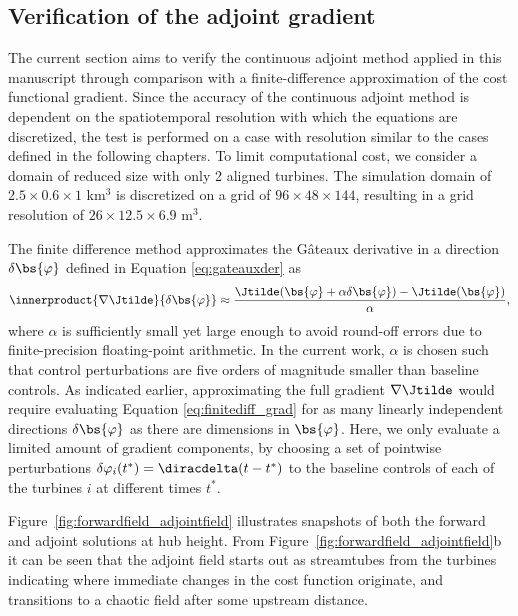 	\subsection{Verification of the adjoint gradient}\label{sec:problem_verification}
	The current section aims to verify the continuous adjoint method applied in this manuscript through comparison with a finite-difference approximation of the cost functional gradient. Since the accuracy of the continuous adjoint method is dependent on the spatiotemporal resolution with which the equations are discretized, the test is performed on a case with resolution similar to the cases defined in the following chapters. To limit computational cost, we consider a domain of reduced size with only 2 aligned turbines. The simulation domain of $2.5 \times 0.6 \times 1$ km$^3$ is discretized on a grid of $96 \times 48 \times 144$, resulting in a grid resolution of $26 \times 12.5 \times 6.9$ m$^3$. 
	
	The finite difference method approximates the G\^ateaux derivative in a direction $\delta \bs{\varphi}$ defined in Equation \eqref{eq:gateauxder} as
	\begin{equation}\label{eq:finitediff_grad}
		\innerproduct{\nabla \Jtilde}{\delta \bs{\varphi}} \approx \frac{\Jtilde(\bs{\varphi} + \alpha \delta \bs{\varphi}) - \Jtilde(\bs{\varphi})}{\alpha},
	\end{equation}
	where $\alpha$ is sufficiently small yet large enough to avoid round-off errors due to finite-precision floating-point arithmetic. In the current work, $\alpha$ is chosen such that control perturbations are five  orders of magnitude smaller than baseline controls. As indicated earlier, approximating the full gradient $\nabla \Jtilde$ would require evaluating Equation \eqref{eq:finitediff_grad} for as many linearly independent directions $\delta \bs{\varphi}$ as there are dimensions in $\bs{\varphi}$. Here, we only evaluate a limited amount of gradient components, by choosing a set of pointwise perturbations $\delta \varphi_i(t^*) =\diracdelta(t-t^*)$ to the baseline controls of each of the turbines $i$ at different times $t^*$. 
	
	Figure~\ref{fig:forwardfield_adjointfield} illustrates snapshots of both the forward and adjoint solutions at hub height. From Figure~\ref{fig:forwardfield_adjointfield}b it can be seen that the adjoint field starts out as streamtubes from the turbines indicating where immediate changes in the cost function originate, and transitions to a chaotic field after some upstream distance. 
	
